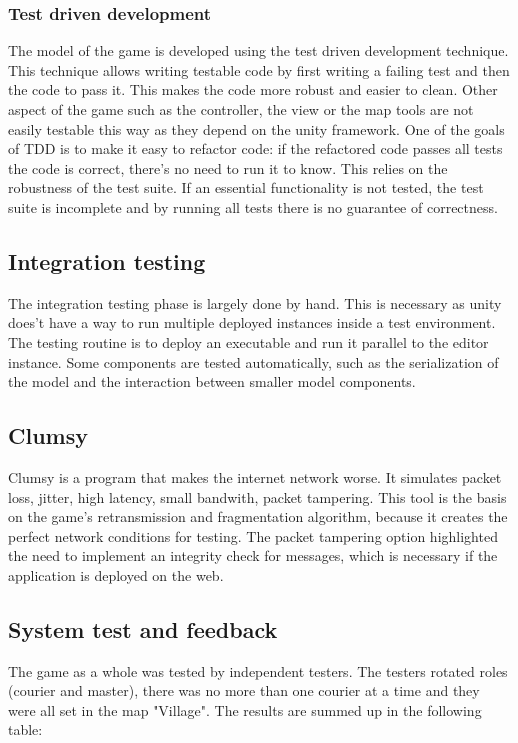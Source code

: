 \documentclass[12pt]{article}
\begin{document}
\subsubsection {Test driven development \cite{tdd}} 
The model of the game is developed using the test driven development technique. This technique allows writing testable code by first writing a failing test and then the code to pass it. This makes the code more robust and easier to clean. Other aspect of the game such as the controller, the view or the map tools are not easily testable this way as they depend on the unity framework. One of the goals of TDD is to make it easy to refactor code: if the refactored code passes all tests the code is correct, there's no need to run it to know. This relies on the robustness of the test suite. If an essential functionality is not tested, the test suite is incomplete and by running all tests there is no guarantee of correctness.
\subsection{Integration testing}
The integration testing phase is largely done by hand. This is necessary as unity does't have a way to run multiple deployed instances inside a test environment. The testing routine is to deploy an executable and run it parallel to the editor instance. Some components are tested automatically, such as the serialization of the model and the interaction between smaller model components.
\subsection{Clumsy \cite{clumsy}}
Clumsy is a program that makes the internet network worse. It simulates packet loss, jitter, high latency, small bandwith, packet tampering. This tool is the basis on the game's retransmission and fragmentation algorithm, because it creates the perfect network conditions for testing. The packet tampering option highlighted the need to implement an integrity check for messages, which is necessary if the application is deployed on the web.

\subsection{System test and feedback}
The game as a whole was tested by independent testers. The testers rotated roles (courier and master), there was no more than one courier at a time and they were all set in the map "Village". The results are summed up in the following table:
\end{document}
